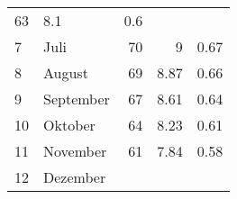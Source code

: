 \begin{longtable}{lXrrr}
       \num{63} &
       \num[round-mode=places,round-precision=2]{8,1} &
         \num[round-mode=places,round-precision=2]{0,6} \\

     7 &
     \multicolumn{1}{X}{ Juli   } &


       \num{70} &
       \num[round-mode=places,round-precision=2]{9} &
         \num[round-mode=places,round-precision=2]{0,67} \\

     8 &
     \multicolumn{1}{X}{ August   } &


       \num{69} &
       \num[round-mode=places,round-precision=2]{8,87} &
         \num[round-mode=places,round-precision=2]{0,66} \\

     9 &
     \multicolumn{1}{X}{ September   } &


       \num{67} &
       \num[round-mode=places,round-precision=2]{8,61} &
         \num[round-mode=places,round-precision=2]{0,64} \\

     10 &
     \multicolumn{1}{X}{ Oktober   } &


       \num{64} &
       \num[round-mode=places,round-precision=2]{8,23} &
         \num[round-mode=places,round-precision=2]{0,61} \\

     11 &
     \multicolumn{1}{X}{ November   } &


       \num{61} &
       \num[round-mode=places,round-precision=2]{7,84} &
         \num[round-mode=places,round-precision=2]{0,58} \\

     12 &
     \multicolumn{1}{X}{ Dezember   } &



\end{longtable}
